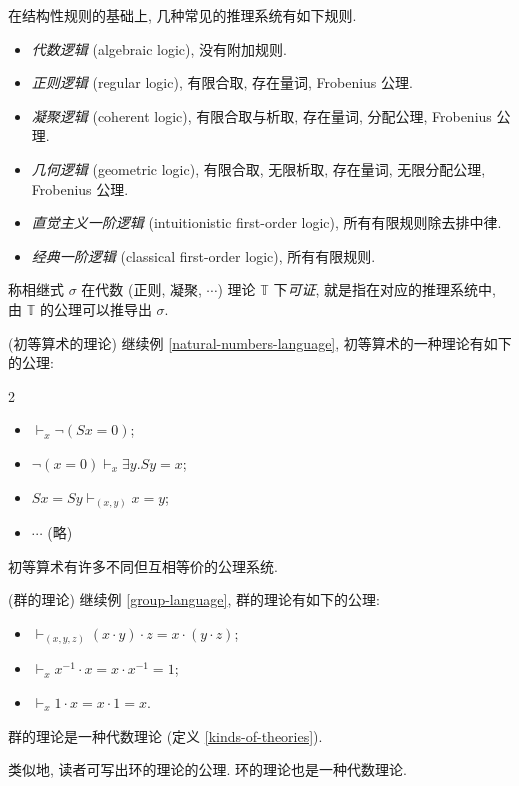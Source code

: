 \begin{definition}
	{}
	在结构性规则的基础上, 几种常见的推理系统有如下规则.
	\begin{itemize}
		\item \emph{代数逻辑} (algebraic logic), 没有附加规则.
		\item \emph{正则逻辑} (regular logic), 有限合取, 存在量词, Frobenius 公理.
		\item \emph{凝聚逻辑} (coherent logic), 有限合取与析取, 存在量词, 分配公理, Frobenius 公理.
		\item \emph{几何逻辑} (geometric logic), 有限合取, 无限析取, 存在量词, 无限分配公理, Frobenius 公理.
		\item \emph{直觉主义一阶逻辑} (intuitionistic first-order logic), 所有有限规则除去排中律.
		\item \emph{经典一阶逻辑} (classical first-order logic), 所有有限规则.
	\end{itemize}
\end{definition}

\begin{definition}
	{}
	称相继式 $\sigma$ 在代数 (正则, 凝聚, $\cdots$) 理论 $\mathbb T$ 下\emph{可证},
	就是指在对应的推理系统中, 由 $\mathbb T$ 的公理可以推导出 $\sigma$.
\end{definition}

\begin{example}
	{(初等算术的理论)}
	继续例 \ref{natural-numbers-language}, 初等算术的一种理论有如下的公理:
	\begin{multicols*}
		{2}
		\begin{itemize}
			\item $\vdash_x \neg (Sx=0)$;
			\item $\neg(x=0) \vdash_{x} \exists y. Sy=x$;
			\item $Sx=Sy\vdash_{(x,y)} x=y$;
			\item $\cdots$ (略)
		\end{itemize}
	\end{multicols*}
	
	初等算术有许多不同但互相等价的公理系统.
\end{example}

\begin{example}
	[label={theory-of-groups}]
	{(群的理论)}
	继续例 \ref{group-language}, 群的理论有如下的公理:
	\begin{itemize}
		\item $\vdash_{(x,y,z)}(x\cdot y)\cdot z = x\cdot (y\cdot z)$;
		\item $\vdash_x x^{-1}\cdot x = x\cdot x^{-1} = 1$;
		\item $\vdash_x 1\cdot x = x\cdot 1 = x$.
	\end{itemize}
	群的理论是一种代数理论 (定义 \ref{kinds-of-theories}).
	
	类似地, 读者可写出环的理论的公理. 环的理论也是一种代数理论.
\end{example}

